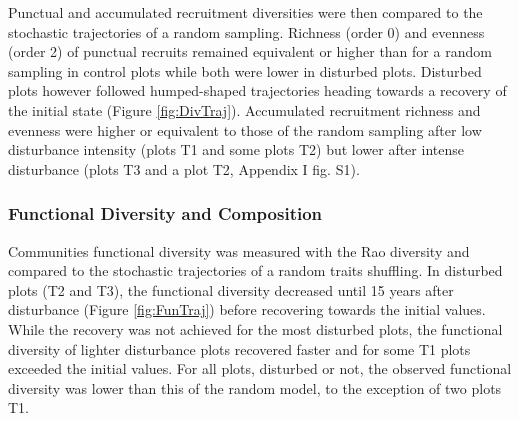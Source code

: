 \documentclass[fleqn,10pt]{ArtEcoFoG} %
\begin{document}
Punctual and accumulated recruitment diversities were then compared to
the stochastic trajectories of a random sampling. Richness (order 0) and
evenness (order 2) of punctual recruits remained equivalent or higher
than for a random sampling in control plots while both were lower in
disturbed plots. Disturbed plots however followed humped-shaped
trajectories heading towards a recovery of the initial state (Figure
\ref{fig:DivTraj}). Accumulated recruitment richness and evenness were
higher or equivalent to those of the random sampling after low
disturbance intensity (plots T1 and some plots T2) but lower after
intense disturbance (plots T3 and a plot T2, Appendix I fig. S1).

\subsubsection{Functional Diversity and
Composition}\label{functional-diversity-and-composition}

Communities functional diversity was measured with the Rao diversity and
compared to the stochastic trajectories of a random traits shuffling. In
disturbed plots (T2 and T3), the functional diversity decreased until 15
years after disturbance (Figure \ref{fig:FunTraj}) before recovering
towards the initial values. While the recovery was not achieved for the
most disturbed plots, the functional diversity of lighter disturbance
plots recovered faster and for some T1 plots exceeded the initial
values. For all plots, disturbed or not, the observed functional
diversity was lower than this of the random model, to the exception of
two plots T1.
\end{document}
